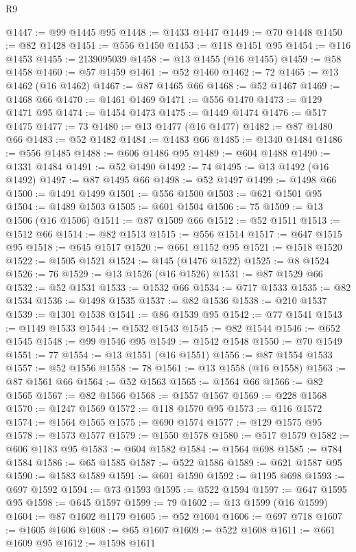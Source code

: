 \begin{lexlean}{R9}
\begin{coremodule}
@1447 := @99 @1445 @95
@1448 := @1433 @1447
@1449 := @70 @1448
@1450 := @82 @1428
@1451 := @556 @1450
@1453 := @118 @1451 @95
@1454 := @116 @1453
@1455 := 2139095039
@1458 := @13 @1455 (@16 @1455)
@1459 := @58 @1458
@1460 := @57 @1459
@1461 := @52 @1460
@1462 := 72
@1465 := @13 @1462 (@16 @1462)
@1467 := @87 @1465 @66
@1468 := @52 @1467
@1469 := @1468 @66
@1470 := @1461 @1469
@1471 := @556 @1470
@1473 := @129 @1471 @95
@1474 := @1454 @1473
@1475 := @1449 @1474
@1476 := @517 @1475
@1477 := 73
@1480 := @13 @1477 (@16 @1477)
@1482 := @87 @1480 @66
@1483 := @52 @1482
@1484 := @1483 @66
@1485 := @1340 @1484
@1486 := @556 @1485
@1488 := @606 @1486 @95
@1489 := @604 @1488
@1490 := @1331 @1484
@1491 := @52 @1490
@1492 := 74
@1495 := @13 @1492 (@16 @1492)
@1497 := @87 @1495 @66
@1498 := @52 @1497
@1499 := @1498 @66
@1500 := @1491 @1499
@1501 := @556 @1500
@1503 := @621 @1501 @95
@1504 := @1489 @1503
@1505 := @601 @1504
@1506 := 75
@1509 := @13 @1506 (@16 @1506)
@1511 := @87 @1509 @66
@1512 := @52 @1511
@1513 := @1512 @66
@1514 := @82 @1513
@1515 := @556 @1514
@1517 := @647 @1515 @95
@1518 := @645 @1517
@1520 := @661 @1152 @95
@1521 := @1518 @1520
@1522 := @1505 @1521
@1524 := @145 (@1476 @1522)
@1525 := @8 @1524
@1526 := 76
@1529 := @13 @1526 (@16 @1526)
@1531 := @87 @1529 @66
@1532 := @52 @1531
@1533 := @1532 @66
@1534 := @717 @1533
@1535 := @82 @1534
@1536 := @1498 @1535
@1537 := @82 @1536
@1538 := @210 @1537
@1539 := @1301 @1538
@1541 := @86 @1539 @95
@1542 := @77 @1541
@1543 := @1149 @1533
@1544 := @1532 @1543
@1545 := @82 @1544
@1546 := @652 @1545
@1548 := @99 @1546 @95
@1549 := @1542 @1548
@1550 := @70 @1549
@1551 := 77
@1554 := @13 @1551 (@16 @1551)
@1556 := @87 @1554 @1533
@1557 := @52 @1556
@1558 := 78
@1561 := @13 @1558 (@16 @1558)
@1563 := @87 @1561 @66
@1564 := @52 @1563
@1565 := @1564 @66
@1566 := @82 @1565
@1567 := @82 @1566
@1568 := @1557 @1567
@1569 := @228 @1568
@1570 := @1247 @1569
@1572 := @118 @1570 @95
@1573 := @116 @1572
@1574 := @1564 @1565
@1575 := @690 @1574
@1577 := @129 @1575 @95
@1578 := @1573 @1577
@1579 := @1550 @1578
@1580 := @517 @1579
@1582 := @606 @1183 @95
@1583 := @604 @1582
@1584 := @1564 @698
@1585 := @784 @1584
@1586 := @65 @1585
@1587 := @522 @1586
@1589 := @621 @1587 @95
@1590 := @1583 @1589
@1591 := @601 @1590
@1592 := @1195 @698
@1593 := @697 @1592
@1594 := @73 @1593
@1595 := @522 @1594
@1597 := @647 @1595 @95
@1598 := @645 @1597
@1599 := 79
@1602 := @13 @1599 (@16 @1599)
@1604 := @87 @1602 @1179
@1605 := @52 @1604
@1606 := @697 @718
@1607 := @1605 @1606
@1608 := @65 @1607
@1609 := @522 @1608
@1611 := @661 @1609 @95
@1612 := @1598 @1611

\end{coremodule}
\end{lexlean}
